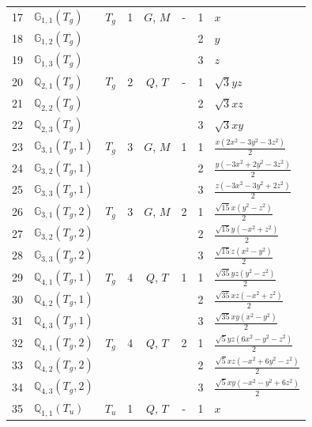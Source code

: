 \documentclass[fleqn,10pt,landscape]{jsarticle}
\begin{document}
\begin{longtable}[l]{clcccccl}
17 & $\mathbb{G}_{1,1}(T_{g})$ & $T_{g}$ & 1 & $G$, $M$ & - & 1 & $x$ \\
18 & $\mathbb{G}_{1,2}(T_{g})$ &  &  &  &  & 2 & $y$ \\
19 & $\mathbb{G}_{1,3}(T_{g})$ &  &  &  &  & 3 & $z$ \\ \hline
20 & $\mathbb{Q}_{2,1}(T_{g})$ & $T_{g}$ & 2 & $Q$, $T$ & - & 1 & $\sqrt{3} y z$ \\
21 & $\mathbb{Q}_{2,2}(T_{g})$ &  &  &  &  & 2 & $\sqrt{3} x z$ \\
22 & $\mathbb{Q}_{2,3}(T_{g})$ &  &  &  &  & 3 & $\sqrt{3} x y$ \\ \hline
23 & $\mathbb{G}_{3,1}(T_{g},1)$ & $T_{g}$ & 3 & $G$, $M$ & 1 & 1 & $\frac{x \left(2 x^{2} - 3 y^{2} - 3 z^{2}\right)}{2}$ \\
24 & $\mathbb{G}_{3,2}(T_{g},1)$ &  &  &  &  & 2 & $\frac{y \left(- 3 x^{2} + 2 y^{2} - 3 z^{2}\right)}{2}$ \\
25 & $\mathbb{G}_{3,3}(T_{g},1)$ &  &  &  &  & 3 & $\frac{z \left(- 3 x^{2} - 3 y^{2} + 2 z^{2}\right)}{2}$ \\ \hline
26 & $\mathbb{G}_{3,1}(T_{g},2)$ & $T_{g}$ & 3 & $G$, $M$ & 2 & 1 & $\frac{\sqrt{15} x \left(y^{2} - z^{2}\right)}{2}$ \\
27 & $\mathbb{G}_{3,2}(T_{g},2)$ &  &  &  &  & 2 & $\frac{\sqrt{15} y \left(- x^{2} + z^{2}\right)}{2}$ \\
28 & $\mathbb{G}_{3,3}(T_{g},2)$ &  &  &  &  & 3 & $\frac{\sqrt{15} z \left(x^{2} - y^{2}\right)}{2}$ \\ \hline
29 & $\mathbb{Q}_{4,1}(T_{g},1)$ & $T_{g}$ & 4 & $Q$, $T$ & 1 & 1 & $\frac{\sqrt{35} y z \left(y^{2} - z^{2}\right)}{2}$ \\
30 & $\mathbb{Q}_{4,2}(T_{g},1)$ &  &  &  &  & 2 & $\frac{\sqrt{35} x z \left(- x^{2} + z^{2}\right)}{2}$ \\
31 & $\mathbb{Q}_{4,3}(T_{g},1)$ &  &  &  &  & 3 & $\frac{\sqrt{35} x y \left(x^{2} - y^{2}\right)}{2}$ \\ \hline
32 & $\mathbb{Q}_{4,1}(T_{g},2)$ & $T_{g}$ & 4 & $Q$, $T$ & 2 & 1 & $\frac{\sqrt{5} y z \left(6 x^{2} - y^{2} - z^{2}\right)}{2}$ \\
33 & $\mathbb{Q}_{4,2}(T_{g},2)$ &  &  &  &  & 2 & $\frac{\sqrt{5} x z \left(- x^{2} + 6 y^{2} - z^{2}\right)}{2}$ \\
34 & $\mathbb{Q}_{4,3}(T_{g},2)$ &  &  &  &  & 3 & $\frac{\sqrt{5} x y \left(- x^{2} - y^{2} + 6 z^{2}\right)}{2}$ \\ \hline
35 & $\mathbb{Q}_{1,1}(T_{u})$ & $T_{u}$ & 1 & $Q$, $T$ & - & 1 & $x$ \\

\end{longtable}
\end{document}
